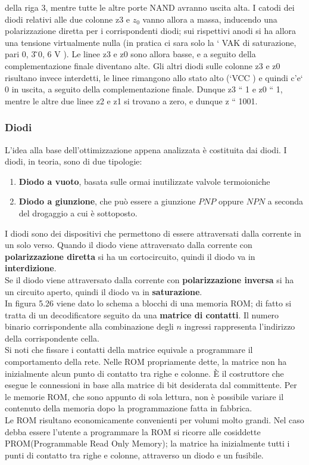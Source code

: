 \documentclass[a4paper]{extarticle}
\begin{document}
della riga 3, mentre tutte le altre porte NAND avranno uscita alta. I catodi dei diodi relativi alle due colonne z3 e \(z_0\) vanno allora a massa, inducendo una polarizzazione diretta per i corrispondenti diodi; sui rispettivi anodi si ha
allora una tensione virtualmente nulla (in pratica ci sara solo la ` VAK di saturazione, pari 0, 3 ̃0, 6 V ). Le linee z3
e z0 sono allora basse, e a seguito della complementazione finale diventano alte. Gli altri diodi sulle colonne z3
e z0 risultano invece interdetti, le linee rimangono allo stato alto (`VCC ) e quindi c’e` 0 in uscita, a seguito della
complementazione finale. Dunque z3 “ 1 e z0 “ 1, mentre le altre due linee z2 e z1 si trovano a zero, e dunque
z “ 1001.

\subsubsection{Diodi}
L'idea alla base dell'ottimizzazione appena analizzata è costituita dai diodi. I diodi, in teoria, sono di due tipologie:
\begin{enumerate}
    \item \textbf{Diodo a vuoto}, basata sulle ormai inutilizzate valvole termoioniche
    \item \textbf{Diodo a giunzione}, che può essere a giunzione \(PNP\) oppure \(NPN\) a seconda del drogaggio a cui è sottoposto.
\end{enumerate}

\vspace{1em}
\noindent
I diodi sono dei dispositivi che permettono di essere attraversati dalla corrente in un solo verso. Quando il diodo viene attraversato dalla corrente con \textbf{polarizzazione diretta} si ha un cortocircuito, quindi il diodo va in \textbf{interdizione}.\\
Se il diodo viene attraversato dalla corrente con \textbf{polarizzazione inversa} si ha un circuito aperto, quindi il diodo va in \textbf{saturazione}.\\
In figura 5.26 viene dato lo schema a blocchi di una memoria ROM; di fatto si tratta di un decodificatore seguito da una \textbf{matrice di contatti}. Il numero binario corrispondente alla combinazione degli \(n\) ingressi rappresenta l’indirizzo della corrispondente cella.\\
Si noti che fissare i contatti della matrice equivale a programmare il comportamento della rete. Nelle ROM propriamente dette, la matrice non ha inizialmente alcun punto di contatto tra righe e colonne. È il costruttore che esegue le connessioni in base alla matrice di bit desiderata dal committente. Per le memorie ROM, che sono appunto di sola lettura, non è possibile variare il contenuto della memoria dopo la programmazione fatta in fabbrica.\\
Le ROM risultano economicamente convenienti per volumi molto grandi.
Nel caso debba essere l’utente a programmare la ROM si ricorre alle cosiddette PROM(Programmable Read Only
Memory); la matrice ha inizialmente tutti i punti di contatto tra righe e colonne, attraverso un diodo e un fusibile.
\end{document}
